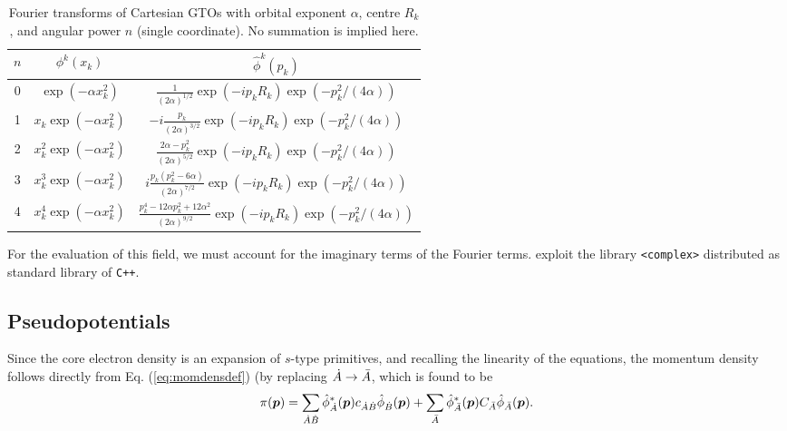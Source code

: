 \begin{table}[ht!]
\begin{center}
\begin{tabular}{||c|c|c||}
\hline
\hline
   $n$ & $\phi^k(x_k)$ & $\hat{\phi}^k(p_k)$\\
\hline
   0 & $\exp(-\alpha x_k^2)$  & $\frac{1}{(2\alpha)^{1/2}}\exp(-ip_kR_k)\exp(-p_k^2/(4\alpha))$ \\
\hline
   1 & $x_k\exp(-\alpha x_k^2)$ & $-i\frac{p_k}{(2\alpha)^{3/2}}\exp(-ip_kR_k)\exp(-p_k^2/(4\alpha))$\\
\hline
   2 & $x_k^2\exp(-\alpha x_k^2)$ & $\frac{2\alpha-p_k^2}{(2\alpha)^{5/2}}\exp(-ip_kR_k)\exp(-p_k^2/(4\alpha))$ \\
\hline
   3 & $x_k^3\exp(-\alpha x_k^2)$ & $i\frac{p_k(p_k^2-6\alpha)}{(2\alpha)^{7/2}}\exp(-ip_kR_k)\exp(-p_k^2/(4\alpha))$ \\
\hline
   4 & $x_k^4\exp(-\alpha x_k^2)$ & $\frac{p_k^4-12\alpha p_k^2+12\alpha^2}{(2\alpha)^{9/2}}\exp(-ip_kR_k)\exp(-p_k^2/(4\alpha))$ \\
\hline
\hline
\end{tabular}
\caption{Fourier transforms of Cartesian GTOs with orbital exponent $\alpha$, centre $R_k$, and angular power $n$ (single coordinate). No summation is implied here.}\label{tab:momdensang}
\end{center}
\end{table}

For the evaluation of this field, we must account for the imaginary terms of the Fourier terms. \DTK{} exploit the library \texttt{<complex>} distributed as standard library of \texttt{C++}. 

\subsection{Pseudopotentials}

Since the core electron density is an expansion of $s$-type primitives, and recalling
the linearity of the equations, the momentum density follows directly from Eq.
(\ref{eq:momdensdef}) (by replacing $\dot{A}\to\bar{A}$, which is found to be
%
\begin{equation}%
  \pi(\boldsymbol{p})=\sum_{\dA\dB}
   \hat{\phi}_{\dA}^*(\boldsymbol{p})c_{\dA\dB}\hat{\phi}_{\dB}(\boldsymbol{p})+
   \sum_{\bA}
   \hat{\phi}_{\bA}^*(\boldsymbol{p})C_{\bA}\hat{\phi}_{\bA}(\boldsymbol{p}).
\end{equation}
%


